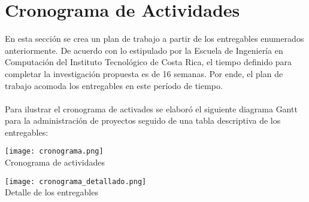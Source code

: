 \section{\textbf{Cronograma de Actividades}}
En esta secci\'on se crea un plan de trabajo a partir de los entregables enumerados anteriormente. De acuerdo con lo estipulado por la Escuela de Ingenier\'ia en Computaci\'on del Instituto Tecnol\'ogico de Costa Rica, el tiempo definido para completar la investigaci\'on propuesta es de 16 semanas. Por ende, el plan de trabajo acomoda los entregables en este per\'iodo de tiempo.
\\\\
Para ilustrar el cronograma de activades se elabor\'o el siguiente diagrama Gantt para la administraci\'on de proyectos seguido de una tabla descriptiva de los entregables:
\\
\begin{table}[ht]
\centering
\texttt{[image: cronograma.png]}\\
\caption{Cronograma de actividades}
\label{arm:tabla}
\begin{center}
\end{center}
\end{table}

\begin{table}[ht]
\centering
\texttt{[image: cronograma\_detallado.png]}\\
\caption{Detalle de los entregables}
\label{arm:tabla}
\begin{center}
\end{center}
\end{table}
